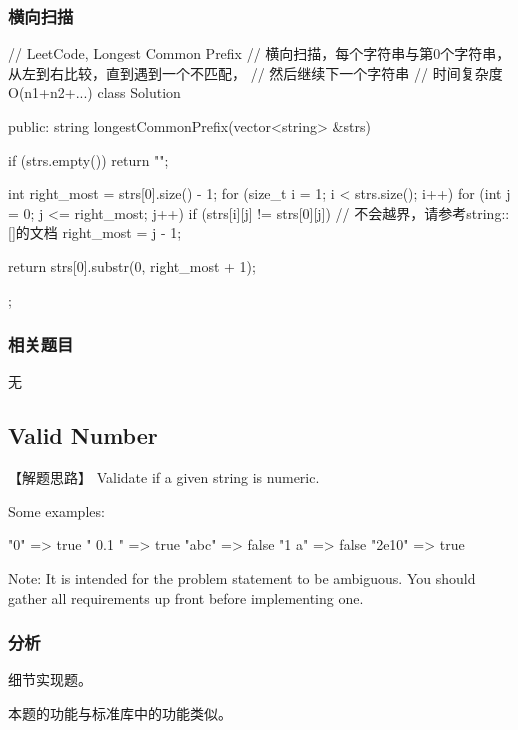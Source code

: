 \subsubsection{横向扫描}
\begin{Code}
	// LeetCode, Longest Common Prefix
	// 横向扫描，每个字符串与第0个字符串，从左到右比较，直到遇到一个不匹配，
	// 然后继续下一个字符串
	// 时间复杂度O(n1+n2+...)
	class Solution {
		public:
		string longestCommonPrefix(vector<string> &strs) {
			if (strs.empty()) return "";
			
			int right_most = strs[0].size() - 1;
			for (size_t i = 1; i < strs.size(); i++)
			for (int j = 0; j <= right_most; j++)
			if (strs[i][j] != strs[0][j])  // 不会越界，请参考string::[]的文档
			right_most = j - 1;
			
			return strs[0].substr(0, right_most + 1);
		}
	};
\end{Code}


\subsubsection{相关题目}
\begindot
\item 无
\myenddot


\subsection{Valid Number} %
\label{sec:valid-number}


【解题思路】
Validate if a given string is numeric.

Some examples:
\begin{Code}
	"0" => true
	" 0.1 " => true
	"abc" => false
	"1 a" => false
	"2e10" => true
\end{Code}

Note: It is intended for the problem statement to be ambiguous. You should gather all requirements up front before implementing one.


\subsubsection{分析}
细节实现题。

本题的功能与标准库中的功能类似。


